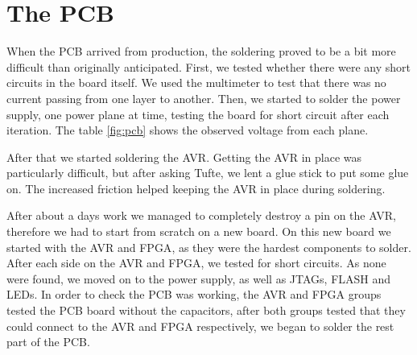 \section {The PCB}



When the \ac{PCB} arrived from production, the soldering proved
to be a bit more difficult than originally anticipated.
First, we tested whether
there were any short circuits in the board itself. We used the multimeter to test that
there was no current passing from one layer to another. Then, we started to solder the power supply, one power plane at time, testing the board for short
circuit after each iteration. The table \ref{fig:pcb} shows the observed voltage from each plane.



After that we started soldering the AVR. Getting the AVR in place was particularly difficult,
but after asking Tufte, we lent a glue stick to put some glue on. The increased friction helped keeping the AVR in place during soldering.

After about a days work we managed to completely destroy a pin on the AVR,
therefore we had to start from scratch on a new board. On this new board we
started with the AVR and \ac{FPGA}, as they were the hardest components to
solder. After each side on the AVR and \ac{FPGA}, we tested for short
circuits. As none were found, we moved on to the power supply, as well as
\acp{JTAG}, FLASH and \acp{LED}. In order to check the \ac{PCB} was working, the
AVR and \ac{FPGA} groups tested the \ac{PCB} board without the capacitors, after
both groups tested that they could connect to the AVR and \ac{FPGA}
respectively, we began to solder the rest part of the \ac{PCB}.


